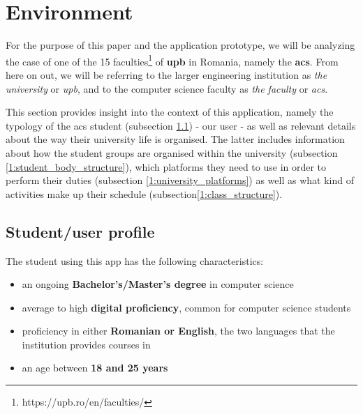 \section{Environment} \label{1:environment}

    For the purpose of this paper and the application prototype, we will be analyzing the case of one of the 15 faculties\footnote{https://upb.ro/en/faculties/} of \textbf{\acrlong{upb}} in Romania, namely the \textbf{\acrlong{acs}}. From here on out, we will be referring to the larger engineering institution as \textit{the university} or \textit{\acrshort{upb}}, and to the computer science faculty as \textit{the faculty} or \textit{\acrshort{acs}}.
    
    This section provides insight into the context of this application, namely the typology of the \acrshort{acs} student (subsection \ref{2:student_profile}) - our user - as well as relevant details about the way their university life is organised. The latter includes information about how the student groups are organised within the university (subsection \ref{1:student_body_structure}), which platforms they need to use in order to perform their duties (subsection \ref{1:university_platforms}) as well as what kind of activities make up their schedule (subsection\ref{1:class_structure}).
    
    \subsection{Student/user profile} \label{2:student_profile}
    
        The student using this app has the following characteristics:
        \begin{itemize}
            \setlength{\topsep}{0.5pt}
            \setlength{\itemsep}{0.5pt}
            \setlength{\parsep}{0.5pt}
            \item an ongoing \textbf{Bachelor's/Master's degree} in computer science
            \item average to high \textbf{digital proficiency}, common for computer science students%
            \item proficiency in either \textbf{Romanian or English}, the two languages that the institution provides courses in%
            \item an age between \textbf{18 and 25 years}
        \end{itemize}
        
